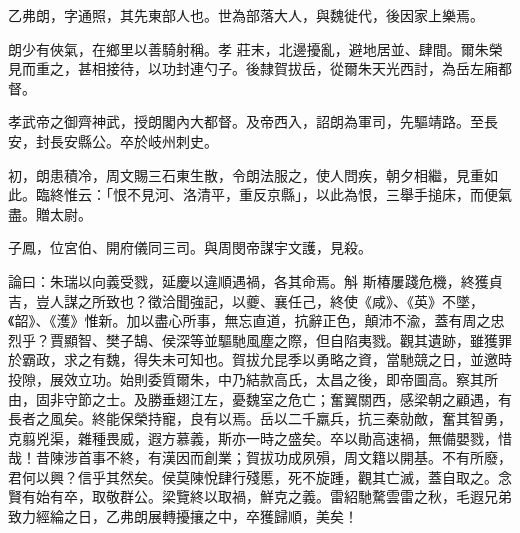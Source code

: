 \begin{pinyinscope}
 乙弗朗，字通照，其先東部人也。世為部落大人，與魏徙代，後因家上樂焉。



 朗少有俠氣，在鄉里以善騎射稱。孝
 莊末，北邊擾亂，避地居並、肆間。爾朱榮見而重之，甚相接待，以功封連勺子。後隸賀拔岳，從爾朱天光西討，為岳左廂都督。



 孝武帝之御齊神武，授朗閣內大都督。及帝西入，詔朗為軍司，先驅靖路。至長安，封長安縣公。卒於岐州刺史。



 初，朗患積冷，周文賜三石東生散，令朗法服之，使人問疾，朝夕相繼，見重如此。臨終惟云：「恨不見河、洛清平，重反京縣」，以此為恨，三舉手搥床，而便氣盡。贈太尉。



 子鳳，位宮伯、開府儀同三司。與周閔帝謀宇文護，見殺。



 論曰：朱瑞以向義受戮，延慶以違順遇禍，各其命焉。斛
 斯椿屢踐危機，終獲貞吉，豈人謀之所致也？徵洽聞強記，以夔、襄任己，終使《咸》、《英》不墜，《韶》、《濩》惟新。加以盡心所事，無忘直道，抗辭正色，顛沛不渝，蓋有周之忠烈乎？賈顯智、樊子鵠、侯深等並驅馳風塵之際，但自陷夷戮。觀其遺跡，雖獲罪於霸政，求之有魏，得失未可知也。賀拔允昆季以勇略之資，當馳競之日，並邀時投隙，展效立功。始則委質爾朱，中乃結款高氏，太昌之後，即帝圖高。察其所由，固非守節之士。及勝垂翅江左，憂魏室之危亡；奮翼關西，感梁朝之顧遇，有長者之風矣。終能保榮持寵，良有以焉。岳以二千羸兵，抗三秦勍敵，奮其智勇，
 克翦兇渠，雜種畏威，遐方慕義，斯亦一時之盛矣。卒以勛高速禍，無備嬰戮，惜哉！昔陳涉首事不終，有漢因而創業；賀拔功成夙殞，周文籍以開基。不有所廢，君何以興？信乎其然矣。侯莫陳悅肆行殘慝，死不旋踵，觀其亡滅，蓋自取之。念賢有始有卒，取敬群公。梁覽終以取禍，鮮克之義。雷紹馳騖雲雷之秋，毛遐兄弟致力經綸之日，乙弗朗展轉擾攘之中，卒獲歸順，美矣！



\end{pinyinscope}